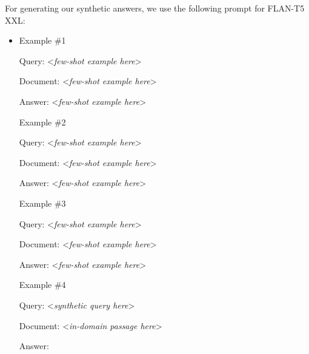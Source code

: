 For generating our synthetic answers, we use the following prompt for FLAN-T5 XXL:

\begin{itemize}
    \item Example \#1

    Query: <\textit{few-shot example here}>
    
    Document: <\textit{few-shot example here}>
    
    Answer: <\textit{few-shot example here}>
    
    Example \#2
    
    Query: <\textit{few-shot example here}>
    
    Document: <\textit{few-shot example here}>
    
    Answer: <\textit{few-shot example here}>

    Example \#3
    
    Query: <\textit{few-shot example here}>
    
    Document: <\textit{few-shot example here}>
    
    Answer: <\textit{few-shot example here}>

    Example \#4
    
    Query: <\textit{synthetic query here}>
    
    Document: <\textit{in-domain passage here}>
    
    Answer:
\end{itemize}

















